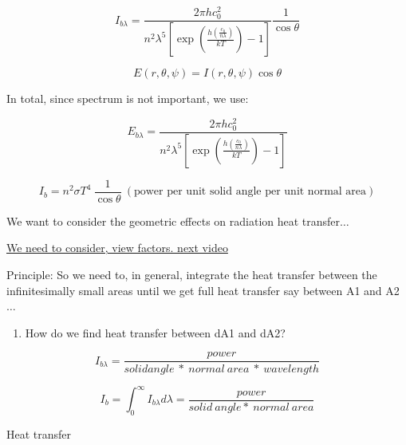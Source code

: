 \documentclass[12pt]{article}
\renewcommand{\_}{\kern-1.5pt\textunderscore\kern-1.5pt}
\begin{document}
 \[ I_{b \lambda }=\frac{2 \pi hc_{0}^{2}}{n^{2} \lambda ^{5} \left[ \exp  \left( \frac{h \left( \frac{c_{0}}{n \lambda } \right) }{kT} \right) -1 \right] }\frac{1}{\cos  \theta } \] \par

 \[ E \left( r, \theta , \psi  \right)  =I \left( r, \theta , \psi  \right) \cos  \theta  \] \par

In total, since spectrum is not important, we use:\par

\par

\par

 \[ E_{b \lambda }=\frac{2 \pi hc_{0}^{2}}{n^{2} \lambda ^{5} \left[ \exp  \left( \frac{h \left( \frac{c_{0}}{n \lambda } \right) }{kT} \right) -1 \right] } \] \par

 \[ I_{b}=n^{2} \sigma T^{4}~\frac{1}{\cos  \theta }~ \left( \text{power per unit solid angle per unit normal area} \right)  \] \par

We want to consider the geometric effects on radiation heat transfer$ \ldots $ \par

\uline{We need to consider, view factors.  next video}\par

\par

Principle: So we need to, in general, integrate the heat transfer between the infinitesimally small areas until we get full heat transfer say between A1 and A2$ \ldots $ \par

\begin{enumerate}
	\item How do we find heat transfer between dA1 and dA2?
\end{enumerate}\par

 \[ I_{b \lambda }=\frac{power}{solid angle~\ast~normal~area~\ast~wavelength} \] \par

 \[ I_{b}= \int _{0}^{\infty}I_{b \lambda }d \lambda =\frac{power}{solid~angle\ast~normal~area} \] \par

Heat transfer\par
\end{document}
